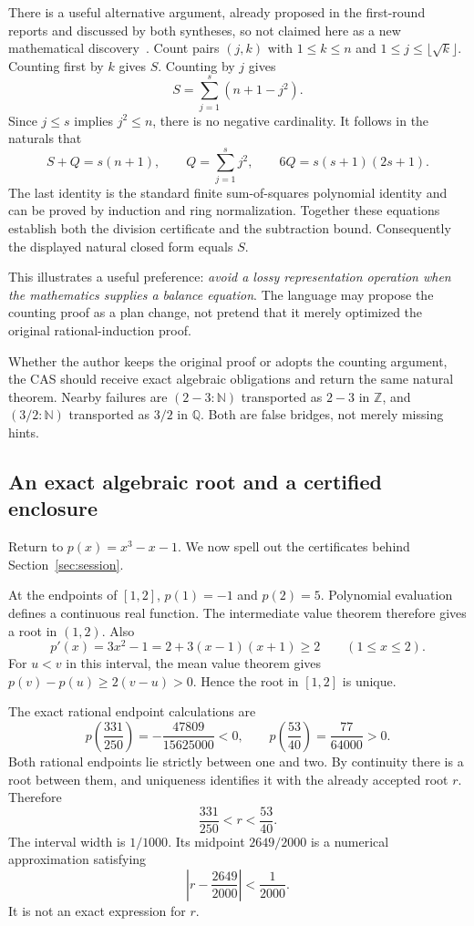 \documentclass[11pt,a4paper]{article}
\newcommand{\N}{\mathbb N}\newcommand{\Z}{\mathbb Z}
\newcommand{\Q}{\mathbb Q}\newcommand{\R}{\mathbb R}
\theoremstyle{remark}\newtheorem{example}[proposition]{Example}
\begin{document}
There is a useful alternative argument, already proposed in the first-round reports and discussed by both syntheses, so not claimed here as a new mathematical discovery~\cite{synthesis,blueprints}. Count pairs $(j,k)$ with $1\leq k\leq n$ and $1\leq j\leq\lfloor\sqrt k\rfloor$. Counting first by $k$ gives $S$. Counting by $j$ gives
\[
 S=\sum_{j=1}^{s}(n+1-j^2).
\]
Since $j\leq s$ implies $j^2\leq n$, there is no negative cardinality. It follows in the naturals that
\[
 S+Q=s(n+1),\qquad Q=\sum_{j=1}^{s}j^2,
 \qquad 6Q=s(s+1)(2s+1).
\]
The last identity is the standard finite sum-of-squares polynomial identity and can be proved by induction and ring normalization. Together these equations establish both the division certificate and the subtraction bound. Consequently the displayed natural closed form equals $S$.

This illustrates a useful preference: \emph{avoid a lossy representation operation when the mathematics supplies a balance equation}. The language may propose the counting proof as a plan change, not pretend that it merely optimized the original rational-induction proof.

Whether the author keeps the original proof or adopts the counting argument, the CAS should receive exact algebraic obligations and return the same natural theorem. Nearby failures are $(2-3:\N)$ transported as $2-3$ in $\Z$, and $(3/2:\N)$ transported as $3/2$ in $\Q$. Both are false bridges, not merely missing hints.

\subsection{An exact algebraic root and a certified enclosure}\label{sec:rootcase}
Return to $p(x)=x^3-x-1$. We now spell out the certificates behind Section~\ref{sec:session}.

At the endpoints of $[1,2]$, $p(1)=-1$ and $p(2)=5$. Polynomial evaluation defines a continuous real function. The intermediate value theorem therefore gives a root in $(1,2)$. Also
\begin{equation}\label{eq:derivcert}
 p'(x)=3x^2-1=2+3(x-1)(x+1)\geq2
 \qquad(1\leq x\leq2).
\end{equation}
For $u<v$ in this interval, the mean value theorem gives
$p(v)-p(u)\geq2(v-u)>0$. Hence the root in $[1,2]$ is unique.

The exact rational endpoint calculations are
\[
 p\!\left(\frac{331}{250}\right)=-\frac{47809}{15625000}<0,
 \qquad
 p\!\left(\frac{53}{40}\right)=\frac{77}{64000}>0.
\]
Both rational endpoints lie strictly between one and two. By continuity there is a root between them, and uniqueness identifies it with the already accepted root $r$. Therefore
\begin{equation}\label{eq:rootbound}
 \frac{331}{250}<r<\frac{53}{40}.
\end{equation}
The interval width is $1/1000$. Its midpoint $2649/2000$ is a numerical approximation satisfying
\[
 \left|r-\frac{2649}{2000}\right|<\frac1{2000}.
\]
It is not an exact expression for $r$.
\end{document}
